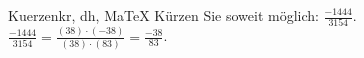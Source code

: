 \begin{MAufgabe}{Kuerzen}{kr, dh, MaTeX}
K\"urzen Sie soweit m\"oglich: $\frac{-1444}{3154}$.\\ 
\ifLsg\MLoesung
\quad $\frac{-1444}{3154}=\frac{(38)\cdot(-38)}{(38)\cdot(83)}=\frac{-38}{83}$.\else\relax\fi
 \end{MAufgabe}